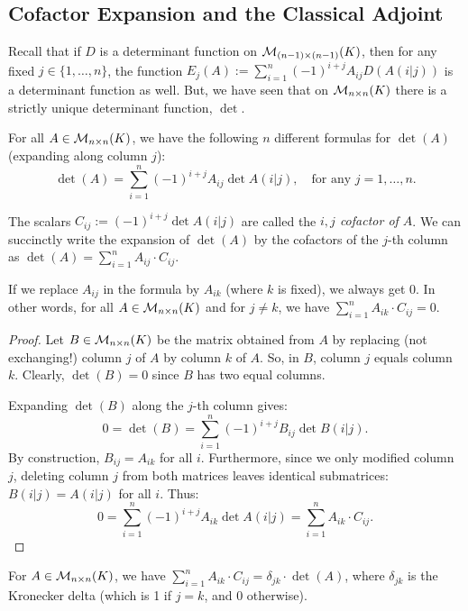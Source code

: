 \subsection{Cofactor Expansion and the Classical Adjoint}

Recall that if $D$ is a determinant function on $\mathcal{M}_{(n-1) \times (n-1)}(K)$, then for any fixed $j \in \{1, \dots, n\}$, the function $E_j(A) := \sum_{i=1}^n (-1)^{i+j} A_{ij} D(A(i|j))$ is a determinant function as well. But, we have seen that on $\mathcal{M}_{n \times n}(K)$ there is a strictly unique determinant function, $\det$.

\begin{corollary}
  \label{cor:cofactor_expansion}
  For all $A \in \mathcal{M}_{n \times n}(K)$, we have the following $n$ different formulas for $\det(A)$ (expanding along column $j$):
  \[
  \det(A) = \sum_{i=1}^n (-1)^{i+j} A_{ij} \det A(i|j), \quad \text{for any } j = 1, \dots, n.
  \]
\end{corollary}

The scalars $C_{ij} := (-1)^{i+j} \det A(i|j)$ are called the \emph{$i,j$ cofactor of $A$}. We can succinctly write the expansion of $\det(A)$ by the cofactors of the $j$-th column as $\det(A) = \sum_{i=1}^n A_{ij} \cdot C_{ij}$.

\begin{lemma*}\label{lem:false_cofactor}
  If we replace $A_{ij}$ in the formula by $A_{ik}$ (where $k$ is fixed), we always get $0$. In other words, for all $A \in \mathcal{M}_{n \times n}(K)$ and for $j \neq k$, we have $\sum_{i=1}^n A_{ik} \cdot C_{ij} = 0$.
\end{lemma*}

\begin{proof}
  Let $B \in \mathcal{M}_{n \times n}(K)$ be the matrix obtained from $A$ by replacing (not exchanging!) column $j$ of $A$ by column $k$ of $A$. So, in $B$, column $j$ equals column $k$. Clearly, $\det(B) = 0$ since $B$ has two equal columns.

  Expanding $\det(B)$ along the $j$-th column gives:
  \[
  0 = \det(B) = \sum_{i=1}^n (-1)^{i+j} B_{ij} \det B(i|j).
  \]
  By construction, $B_{ij} = A_{ik}$ for all $i$. Furthermore, since we only modified column $j$, deleting column $j$ from both matrices leaves identical submatrices: $B(i|j) = A(i|j)$ for all $i$. Thus:
  \[
  0 = \sum_{i=1}^n (-1)^{i+j} A_{ik} \det A(i|j) = \sum_{i=1}^n A_{ik} \cdot C_{ij}.
  \]
\end{proof}

\begin{summary} For $A \in \mathcal{M}_{n \times n}(K)$, we have $\sum_{i=1}^n A_{ik} \cdot C_{ij} = \delta_{jk} \cdot \det(A)$, where $\delta_{jk}$ is the Kronecker delta (which is 1 if $j=k$, and 0 otherwise).
\end{summary}

